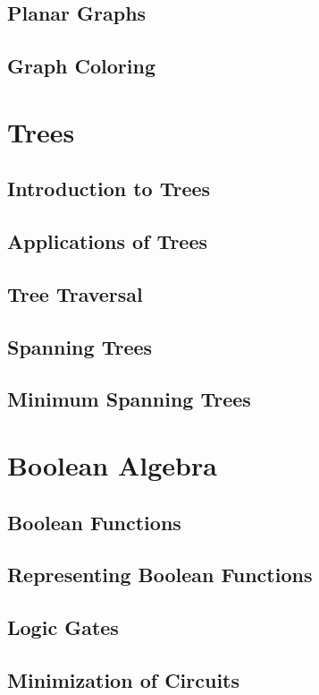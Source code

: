 \documentclass{article}
\begin{document}
\subsection{Planar Graphs}
\subsection{Graph Coloring}

\section{Trees}

\subsection{Introduction to Trees}
\subsection{Applications of Trees }
\subsection{Tree Traversal }
\subsection{Spanning Trees }
\subsection{Minimum Spanning Trees }

\section{Boolean Algebra}

\subsection{Boolean Functions}
\subsection{Representing Boolean Functions}
\subsection{Logic Gates}
\subsection{Minimization of Circuits}
\end{document}
